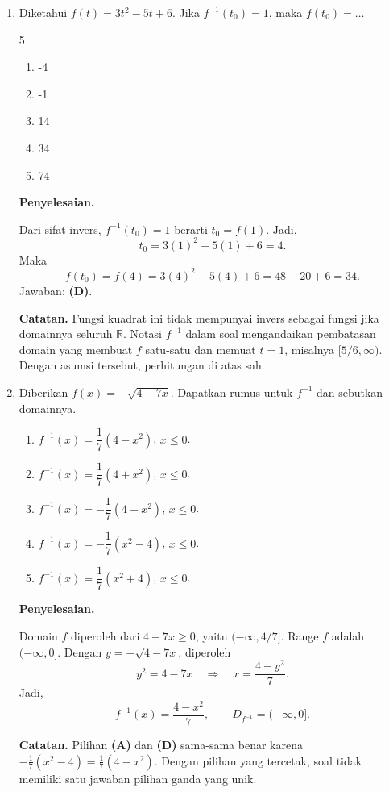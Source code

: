 \documentclass[11pt,a4paper]{article}
\newcommand{\jawab}{\par\medskip\textbf{Penyelesaian.}\par}
\newcommand{\R}{\mathbb{R}}
\newcommand{\catatan}[1]{\par\smallskip\textbf{Catatan.} #1\par}
\begin{document}
\begin{enumerate}
\item[15.] Diketahui $f(t)=3t^2-5t+6$. Jika $f^{-1}(t_0)=1$, maka $f(t_0)=\ldots$
\begin{multicols}{5}
    \begin{enumerate}[label=(\Alph*)]
    \item -4
    \item -1
    \item 14
    \item 34
    \item 74
\end{enumerate}
\end{multicols}

\jawab
Dari sifat invers, $f^{-1}(t_0)=1$ berarti $t_0=f(1)$. Jadi,
\[
    t_0=3(1)^2-5(1)+6=4.
\]
Maka
\[
    f(t_0)=f(4)=3(4)^2-5(4)+6=48-20+6=\boxed{34}.
\]
Jawaban: \textbf{(D)}.\\
\catatan{Fungsi kuadrat ini tidak mempunyai invers sebagai fungsi jika
domainnya seluruh $\R$. Notasi $f^{-1}$ dalam soal mengandaikan pembatasan
domain yang membuat $f$ satu-satu dan memuat $t=1$, misalnya
$[5/6,\infty)$. Dengan asumsi tersebut, perhitungan di atas sah.}
\item[18.] 
Diberikan $f(x)=-\sqrt{4-7x}$. Dapatkan rumus untuk $f^{-1}$ dan sebutkan
domainnya.
\begin{enumerate}[label=(\Alph*)]
    \item $f^{-1}(x)=\dfrac{1}{7}(4-x^2)$, $x\leq 0$.
    \item $f^{-1}(x)=\dfrac{1}{7}(4+x^2)$, $x\leq 0$.
    \item $f^{-1}(x)=-\dfrac{1}{7}(4-x^2)$, $x\leq 0$.
    \item $f^{-1}(x)=-\dfrac{1}{7}(x^2-4)$, $x\leq 0$.
    \item $f^{-1}(x)=\dfrac{1}{7}(x^2+4)$, $x\leq 0$.
\end{enumerate}

\jawab
Domain $f$ diperoleh dari $4-7x\geq 0$, yaitu $(-\infty,4/7]$.
Range $f$ adalah $(-\infty,0]$. Dengan $y=-\sqrt{4-7x}$, diperoleh
\[
    y^2=4-7x\quad\Longrightarrow\quad x=\frac{4-y^2}{7}.
\]
Jadi,
\[
    \boxed{f^{-1}(x)=\frac{4-x^2}{7},\qquad D_{f^{-1}}=(-\infty,0].}
\]
\catatan{Pilihan \textbf{(A)} dan \textbf{(D)} sama-sama benar karena
$-\frac{1}{7}(x^2-4)=\frac{1}{7}(4-x^2)$. Dengan pilihan yang tercetak,
soal tidak memiliki satu jawaban pilihan ganda yang unik.}
\end{enumerate}
\end{document}
